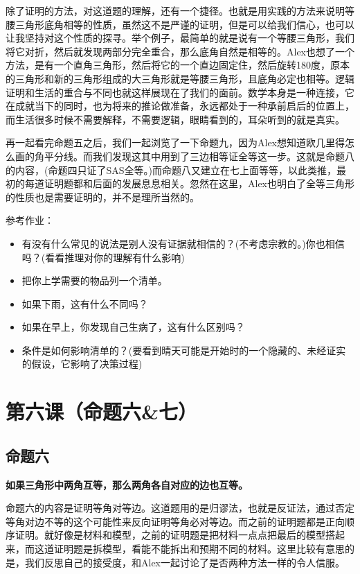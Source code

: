 \documentclass[
]{book}
\providecommand{\tightlist}{%
  \setlength{\itemsep}{0pt}\setlength{\parskip}{0pt}}
\begin{document}
除了证明的方法，对这道题的理解，还有一个捷径。也就是用实践的方法来说明等腰三角形底角相等的性质，虽然这不是严谨的证明，但是可以给我们信心，也可以让我坚持对这个性质的探寻。举个例子，最简单的就是说有一个等腰三角形，我们将它对折，然后就发现两部分完全重合，那么底角自然是相等的。Alex也想了一个方法，是有一个直角三角形，然后将它的一个直边固定住，然后旋转180度，原本的三角形和新的三角形组成的大三角形就是等腰三角形，且底角必定也相等。逻辑证明和生活的重合与不同也就这样展现在了我们的面前。数学本身是一种连接，它在成就当下的同时，也为将来的推论做准备，永远都处于一种承前启后的位置上，而生活很多时候不需要解释，不需要逻辑，眼睛看到的，耳朵听到的就是真实。

再一起看完命题五之后，我们一起浏览了一下命题九，因为Alex想知道欧几里得怎么画的角平分线。而我们发现这其中用到了三边相等证全等这一步。这就是命题八的内容，(命题四只证了SAS全等。)而命题八又建立在七上面等等，以此类推，最初的每道证明题都和后面的发展息息相关。忽然在这里，Alex也明白了全等三角形的性质也是需要证明的，并不是理所当然的。

参考作业：

\begin{itemize}
\tightlist
\item
  有没有什么常见的说法是别人没有证据就相信的？(不考虑宗教的。)你也相信吗？(看看推理对你的理解有什么影响)
\item
  把你上学需要的物品列一个清单。
\item
  如果下雨，这有什么不同吗？
\item
  如果在早上，你发现自己生病了，这有什么区别吗？
\item
  条件是如何影响清单的？(要看到晴天可能是开始时的一个隐藏的、未经证实的假设，它影响了决策过程)
\end{itemize}

\hypertarget{ux7b2cux516dux8bfeux547dux9898ux516dux4e03}{%
\chapter{第六课（命题六\&七）}\label{ux7b2cux516dux8bfeux547dux9898ux516dux4e03}}

\hypertarget{ux547dux9898ux516d}{%
\section{命题六}\label{ux547dux9898ux516d}}

\textbf{如果三角形中两角互等，那么两角各自对应的边也互等。}

命题六的内容是证明等角对等边。这道题用的是归谬法，也就是反证法，通过否定等角对边不等的这个可能性来反向证明等角必对等边。而之前的证明题都是正向顺序证明。就好像是材料和模型，之前的证明题是把材料一点点把最后的模型搭起来，而这道证明题是拆模型，看能不能拆出和预期不同的材料。这里比较有意思的是，我们反思自己的接受度，和Alex一起讨论了是否两种方法一样的令人信服。
\end{document}
